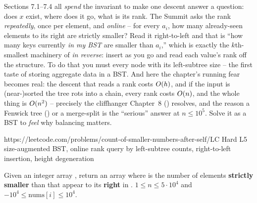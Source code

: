 \begin{notebox}
Sections 7.1--7.4 all \emph{spend} the invariant to make one descent answer a question: does $x$
exist, where does it go, what is its rank. The Summit asks the rank \emph{repeatedly}, once per
element, and \emph{online} -- for every $a_i$, how many already-seen elements to its right are
strictly smaller? Read it right-to-left and that is ``how many keys currently \emph{in my BST} are
smaller than $a_i$,'' which is exactly the $k$th-smallest machinery of  \emph{in
reverse}: insert as you go and read each value's rank off the structure. To do that you must
 every node with its left-subtree size -- the first taste of storing aggregate data in
a BST. And here the chapter's running fear becomes real: the descent that reads a rank costs
$O(h)$, and if the input is (near-)sorted the tree rots into a chain, every rank costs $O(n)$,
and the whole thing is $O(n^2)$ -- precisely the cliffhanger Chapter~8 () resolves, and
the reason a Fenwick tree () or a merge-split is the ``serious'' answer at
$n\le 10^5$. Solve it as a BST to \emph{feel} why balancing matters.
\end{notebox}

  {https://leetcode.com/problems/count-of-smaller-numbers-after-self/}{LC Hard L5}
  {size-augmented BST, online rank query by left-subtree counts, right-to-left insertion, height degeneration}

\begin{problemstatement}
Given an integer array , return an array  where  is the number
of elements \textbf{strictly smaller} than  that appear to its \textbf{right} in
. $1\le n\le 5\cdot 10^{4}$ and $-10^{4}\le \text{nums}[i]\le 10^{4}$.
\end{problemstatement}

